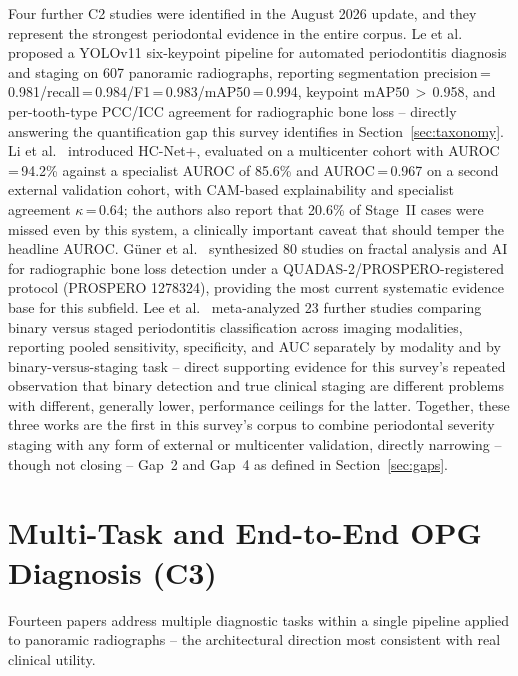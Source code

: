 \documentclass[conference]{IEEEtran}
\begin{document}
Four further C2 studies were identified in the August 2026 update, and
they represent the strongest periodontal evidence in the entire corpus.
Le et al.~\cite{le2026automated} proposed a YOLOv11 six-keypoint
pipeline for automated periodontitis diagnosis and staging on 607
panoramic radiographs, reporting segmentation
precision\,=\,0.981/recall\,=\,0.984/F1\,=\,0.983/mAP50\,=\,0.994,
keypoint mAP50\,$>$\,0.958, and per-tooth-type PCC/ICC agreement for
radiographic bone loss -- directly answering the quantification gap
this survey identifies in Section~\ref{sec:taxonomy}. Li et
al.~\cite{li2025novel} introduced HC-Net+, evaluated on a multicenter
cohort with AUROC\,=\,94.2\% against a specialist AUROC of 85.6\% and
AUROC\,=\,0.967 on a second external validation cohort, with CAM-based
explainability and specialist agreement $\kappa$\,=\,0.64; the authors
also report that 20.6\% of Stage~II cases were missed even by this
system, a clinically important caveat that should temper the headline
AUROC. G\"uner et al.~\cite{guner2026fractal} synthesized 80 studies on
fractal analysis and AI for radiographic bone loss detection under a
QUADAS-2/PROSPERO-registered protocol (PROSPERO 1278324), providing the
most current systematic evidence base for this subfield. Lee et
al.~\cite{lee2025radiographic} meta-analyzed 23 further studies
comparing binary versus staged periodontitis classification across
imaging modalities, reporting pooled sensitivity, specificity, and AUC
separately by modality and by binary-versus-staging task -- direct
supporting evidence for this survey's repeated observation that binary
detection and true clinical staging are different problems with
different, generally lower, performance ceilings for the latter.
Together,
these three works are the first in this survey's corpus to combine
periodontal severity staging with any form of external or multicenter
validation, directly narrowing -- though not closing -- Gap~2 and
Gap~4 as defined in Section~\ref{sec:gaps}.

\section{Multi-Task and End-to-End OPG Diagnosis (C3)}
\label{sec:multitask}

Fourteen papers address multiple diagnostic tasks within a single
pipeline applied to panoramic radiographs -- the architectural
direction most consistent with real clinical utility.
\end{document}
